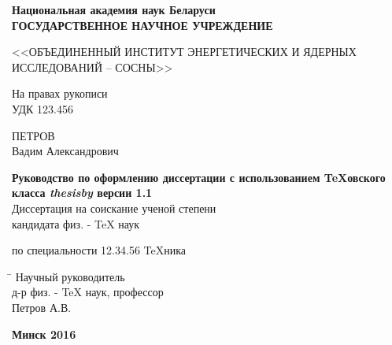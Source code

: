 \begin{titlepage}

\begin{center} \bfseries
 Национальная академия наук Беларуси\\
\bigskip
{ГОСУДАРСТВЕННОЕ НАУЧНОЕ УЧРЕЖДЕНИЕ}
\medskip

{<<ОБЪЕДИНЕННЫЙ ИНСТИТУТ ЭНЕРГЕТИЧЕСКИХ
И ЯДЕРНЫХ ИССЛЕДОВАНИЙ – СОСНЫ>>}
\end{center}
\medskip

\noindent На правах рукописи\\
УДК  123.456 \\
\vspace{1cm}

\begin{center}
{\large ПЕТРОВ \\ Вадим Александрович}\\ \vspace{1cm}

{\bfseries Руководство по оформлению диссертации с использованием \TeX овского класса {\itshape thesisby} версии 1.1}\\
\vspace{2cm}
Диссертация на соискание ученой степени\\
кандидата физ. - \TeX{} наук\\
\medskip

по специальности 12.34.56 \TeX ника 
\end{center}
\vspace{3cm}

\begin{tabbing}
\hspace{8cm} \= \kill \>
Научный руководитель \+ \\
д-р физ. - \TeX{} наук, профессор\\
Петров А.В.
\end{tabbing}
\vspace{5cm}

\begin{center}
 \bfseries Минск 2016
\end{center}

\end{titlepage}